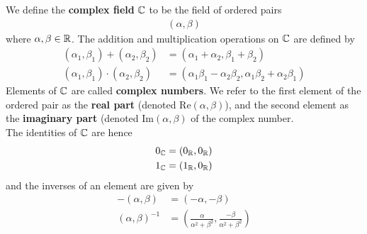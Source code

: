\documentclass{memoir}
\begin{document}
\begin{defn}
	We define the \textbf{complex field} \(\mathbb{C}\) to be the field of ordered pairs
	\begin{align*}
		(\alpha ,\beta )
	\end{align*}
	where \(\alpha ,\beta  \in \mathbb{R}\). The addition and multiplication operations on \(\mathbb{C}\) are defined by
	\begin{align*}
		(\alpha_1,\beta_1) + (\alpha_2,\beta_2) &= (\alpha_1+\alpha_2,\beta_1+\beta_2)\\
		(\alpha_1,\beta_1)\cdot (\alpha_2,\beta_2) &= (\alpha_1\beta_1 - \alpha_2\beta_2, \alpha_1\beta_2+\alpha_2\beta_1)
	\end{align*}
	Elements of \(\mathbb{C}\) are called \textbf{complex numbers}. We refer to the first element of the ordered pair as the \textbf{real part} (denoted \(\textrm{Re}(\alpha ,\beta )\)), and the second element as the \textbf{imaginary part} (denoted \(\textrm{Im}(\alpha ,\beta )\) of the complex number.\\

	The identities of \(\mathbb{C}\) are hence
	\begin{align*}
		0_{\mathbb{C}} &= (0_{\mathbb{R}},0_{\mathbb{R}})\\
		1_{\mathbb{C}} &= (1_{\mathbb{R}},0_{\mathbb{R}})
	\end{align*}
	and the inverses of an element are given by
	\begin{align*}
		-(\alpha,\beta ) &= (-\alpha ,-\beta )\\
		(\alpha ,\beta)^{-1} &= \left( \frac{\alpha }{\alpha^2+\beta^2}, \frac{-\beta }{\alpha^2+\beta^2} \right) 
	\end{align*}
\end{defn}
\end{document}
